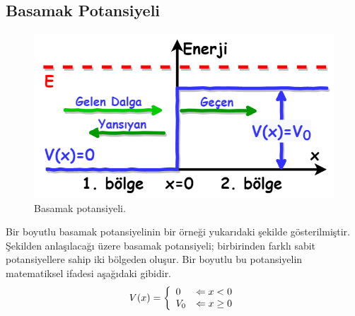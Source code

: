 \documentclass[a4paper,12pt, twoside]{article}
\begin{document}
\subsection{Basamak Potansiyeli}
\begin{figure}[hbtp]
	\centering
	\includegraphics[width=0.6\linewidth]{figurler/Basamak_Potansiyeli.png}
	\caption{Basamak potansiyeli.}
	\label{fig:basamakpotansiyeli}
\end{figure}
Bir boyutlu basamak potansiyelinin bir örneği yukarıdaki şekilde gösterilmiştir. Şekilden anlaşılacağı üzere basamak potansiyeli; birbirinden farklı sabit potansiyellere sahip iki bölgeden oluşur. Bir boyutlu bu potansiyelin matematiksel ifadesi aşağıdaki gibidir.
\begin{align}
V ( x )  = \left\{ 
\begin{array} { l l } 
{ 0 } & {\Leftarrow x < 0 } \\ 
{ V _ { 0 } } & {\Leftarrow x \geq 0 } 
\end{array} \right. 
\end{align}
\end{document}
